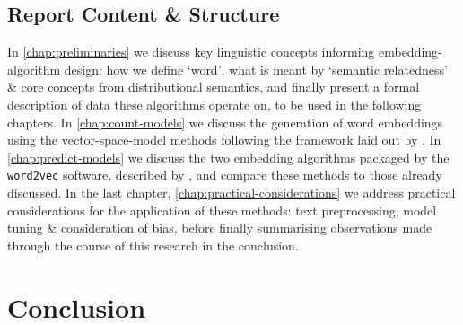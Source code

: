 \documentclass{ucetd}
\begin{document}
\section{Report Content \& Structure}
In \autoref{chap:preliminaries} we discuss key linguistic concepts informing embedding-algorithm design: how we define `word', what is meant by `semantic relatedness' \& core concepts from distributional semantics, and finally present a formal description of data these algorithms operate on, to be used in the following chapters. In \autoref{chap:count-models} we discuss the generation of word embeddings using the vector-space-model methods following the framework laid out by \textcite{turney10-from-frequen-to-meanin}. In \autoref{chap:predict-models} we discuss the two embedding algorithms packaged by the \texttt{word2vec} software, described by \textcite{mikolov13-distr-repres-words-phras-their-compos}, and compare these methods to those already discussed. In the last chapter, \autoref{chap:practical-considerations} we address practical considerations for the application of these methods: text preprocessing, model tuning \& consideration of bias, before finally summarising observations made through the course of this research in the conclusion.




\chapter*{Conclusion}\label{chap:conclusion}
\makebibliography
\end{document}
